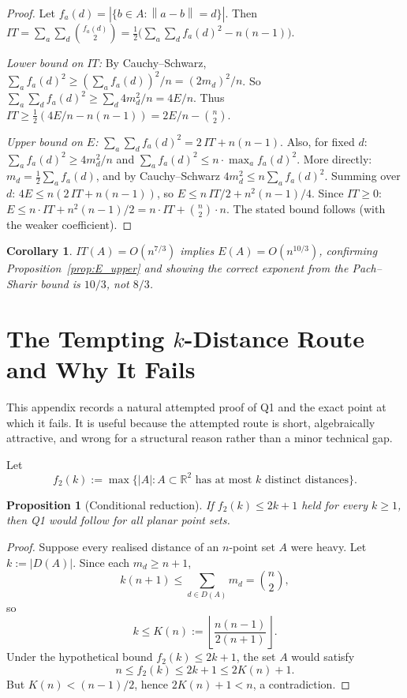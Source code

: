 \documentclass[12pt,a4paper]{amsart}
\theoremstyle{plain}
\newtheorem{proposition}[theorem]{Proposition}
\newtheorem{corollary}[theorem]{Corollary}
\theoremstyle{definition}
\newcommand{\R}{\mathbb{R}}
\newcommand{\abs}[1]{\left\lvert #1 \right\rvert}
\newcommand{\norm}[1]{\left\lVert #1 \right\rVert}
\begin{document}
\begin{proof}
Let $f_a(d) = \abs{\{b \in A : \norm{a-b} = d\}}$.
Then $IT = \sum_a \sum_d \binom{f_a(d)}{2} =
\frac{1}{2}\bigl(\sum_a\sum_d f_a(d)^2 - n(n-1)\bigr)$.

\medskip\noindent\textit{Lower bound on $IT$:}
By Cauchy--Schwarz, $\sum_a f_a(d)^2 \ge (\sum_a f_a(d))^2/n = (2m_d)^2/n$.
So $\sum_a \sum_d f_a(d)^2 \ge \sum_d 4m_d^2/n = 4E/n$.
Thus $IT \ge \frac{1}{2}(4E/n - n(n-1)) = 2E/n - \binom{n}{2}$.

\medskip\noindent\textit{Upper bound on $E$:}
$\sum_a\sum_d f_a(d)^2 = 2\,IT + n(n-1)$.
Also, for fixed $d$: $\sum_a f_a(d)^2 \ge 4m_d^2/n$ and
$\sum_a f_a(d)^2 \le n \cdot \max_a f_a(d)^2$.
More directly: $m_d = \frac{1}{2}\sum_a f_a(d)$, and by
Cauchy--Schwarz $4m_d^2 \le n \sum_a f_a(d)^2$.
Summing over $d$: $4E \le n(2\,IT + n(n-1))$,
so $E \le n\,IT/2 + n^2(n-1)/4$.
Since $IT \ge 0$: $E \le n \cdot IT + n^2(n-1)/2 = n \cdot IT + \binom{n}{2} \cdot n$.
The stated bound follows (with the weaker coefficient).
\end{proof}

\begin{corollary}
$IT(A) = O(n^{7/3})$ implies $E(A) = O(n^{10/3})$, confirming
Proposition~\ref{prop:E_upper} and showing the correct exponent
from the Pach--Sharir bound is $10/3$, not $8/3$.
\end{corollary}

\section{The Tempting $k$-Distance Route and Why It Fails}
\label{app:kdistance_route}

This appendix records a natural attempted proof of Q1 and the exact point
at which it fails.  It is useful because the attempted route is short,
algebraically attractive, and wrong for a structural reason rather than a
minor technical gap.

Let
\[
  f_2(k) := \max\{\abs{A} : A \subset \R^2 \text{ has at most } k
  \text{ distinct distances}\}.
\]

\begin{proposition}[Conditional reduction]
\label{prop:conditional_kdist}
If $f_2(k) \le 2k+1$ held for every $k \ge 1$, then Q1 would follow for
all planar point sets.
\end{proposition}

\begin{proof}
Suppose every realised distance of an $n$-point set $A$ were heavy.
Let $k := \abs{D(A)}$.  Since each $m_d \ge n+1$,
\[
  k(n+1) \le \sum_{d \in D(A)} m_d = \binom{n}{2},
\]
so
\[
  k \le K(n) := \left\lfloor \frac{n(n-1)}{2(n+1)} \right\rfloor.
\]
Under the hypothetical bound $f_2(k) \le 2k+1$, the set $A$ would satisfy
\[
  n \le f_2(k) \le 2k+1 \le 2K(n)+1.
\]
But $K(n) < (n-1)/2$, hence $2K(n)+1<n$, a contradiction.
\end{proof}
\end{document}
